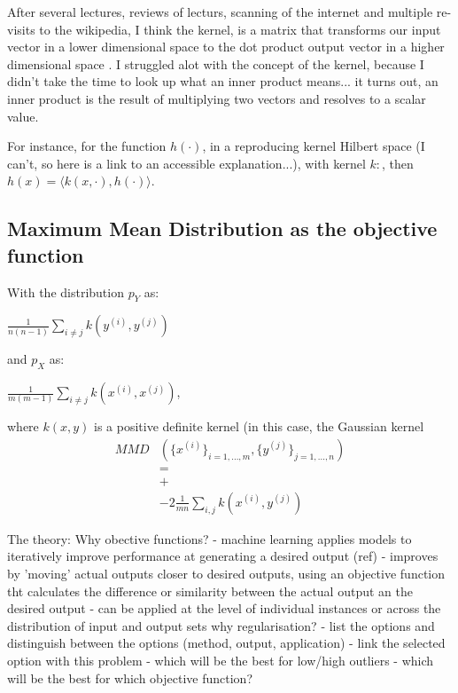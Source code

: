 \documentclass{article}
\begin{document}
After several lectures, reviews of lecturs, scanning of the internet and multiple re-visits to the wikipedia, I think the kernel, is a matrix that transforms our input vector in a lower dimensional space to the dot product output vector in a higher dimensional space \cite{wilimitis_2019} \cite{hofmann2008kernel}.  I struggled alot with the concept of the kernel, because I didn't take the time to look up what an inner product means... it turns out, an inner product is the result of multiplying two vectors and resolves to a scalar value.  

For instance, for the function $h(\cdot)$, in a reproducing kernel Hilbert space (I can't, so here is a link to an accessible explanation...), with kernel $k:$, then $h(x) =\langle k(x, \cdot ), h ( \cdot) \rangle$.

\subsection{Maximum Mean Distribution as the objective function}
\label{ssec:mmd}

With the distribution $p_Y$ as:  

$\frac {1}{n(n-1)}\sum_{i\ne j} k(y^{(i)}, y^{(j)})$  

and $p_X$ as:   

$\frac {1}{m(m-1)}\sum_{i\ne j} k(x^{(i)}, x^{(j)})$,  

where $k(x, y)$ is a positive definite kernel (in this case, the Gaussian
kernel 
$$
\begin {aligned}
MMD&(\{x^{(i)}\}_{i=1, ..., m}, \{y^{(j)}\}_{j=1, ..., n}) \\
  & = \\ 
  & + \\
  & - 2\frac{1}{mn}\sum_{i,j}k(x^{(i)},y^{(j)})
\end {aligned}
$$




The theory:  
Why obective functions?
- machine learning applies models to iteratively improve performance at generating a desired output (ref)
- improves by 'moving' actual outputs closer to desired outputs, using an objective function tht calculates the difference or similarity between the actual output an the desired output
- can be applied at the level of individual instances or across the distribution of input and output sets
why regularisation?
- list the options and distinguish between the options (method, output, application)
- link the selected option with this problem 
  - which will be the best for low/high outliers
  - which will be the best for 
which objective function?
\end{document}
